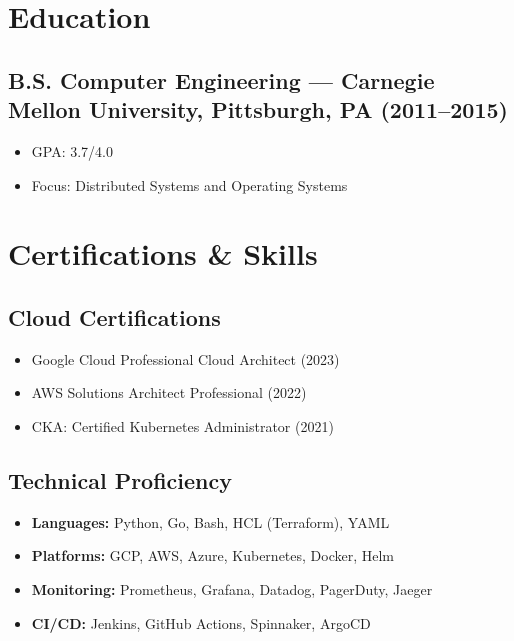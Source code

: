\documentclass[10pt,letterpaper]{article}
\begin{document}
\section{Education}

\subsection{B.S. Computer Engineering --- Carnegie Mellon University, Pittsburgh, PA (2011--2015)}
\begin{itemize}[leftmargin=1.5em]
  \item GPA: 3.7/4.0
  \item Focus: Distributed Systems and Operating Systems
\end{itemize}

\section{Certifications \& Skills}

\subsection{Cloud Certifications}
\begin{itemize}[leftmargin=1.5em]
  \item Google Cloud Professional Cloud Architect (2023)
  \item AWS Solutions Architect Professional (2022)
  \item CKA: Certified Kubernetes Administrator (2021)
\end{itemize}

\subsection{Technical Proficiency}
\begin{itemize}[leftmargin=1.5em]
  \item \textbf{Languages:} Python, Go, Bash, HCL (Terraform), YAML
  \item \textbf{Platforms:} GCP, AWS, Azure, Kubernetes, Docker, Helm
  \item \textbf{Monitoring:} Prometheus, Grafana, Datadog, PagerDuty, Jaeger
  \item \textbf{CI/CD:} Jenkins, GitHub Actions, Spinnaker, ArgoCD
\end{itemize}
\end{document}
